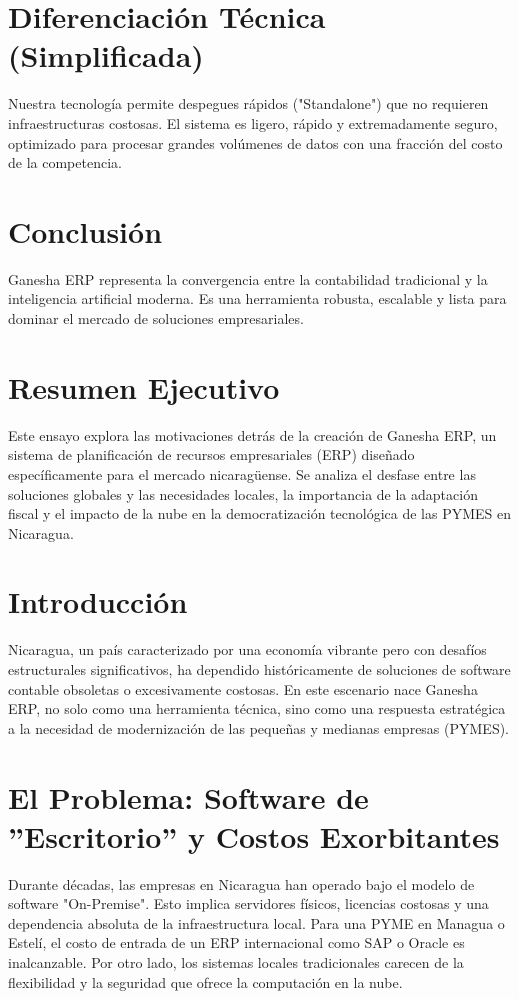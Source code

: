 \documentclass[12pt, a4paper, oneside]{book}
\begin{document}
\chapter{Diferenciación Técnica (Simplificada)}
Nuestra tecnología permite despegues rápidos ("Standalone") que no requieren infraestructuras costosas. El sistema es ligero, rápido y extremadamente seguro, optimizado para procesar grandes volúmenes de datos con una fracción del costo de la competencia.

\chapter{Conclusión}
Ganesha ERP representa la convergencia entre la contabilidad tradicional y la inteligencia artificial moderna. Es una herramienta robusta, escalable y lista para dominar el mercado de soluciones empresariales.



\chapter*{Resumen Ejecutivo}
    Este ensayo explora las motivaciones detrás de la creación de Ganesha ERP, un sistema de planificación de recursos empresariales (ERP) diseñado específicamente para el mercado nicaragüense. Se analiza el desfase entre las soluciones globales y las necesidades locales, la importancia de la adaptación fiscal y el impacto de la nube en la democratización tecnológica de las PYMES en Nicaragua.


\chapter{Introducción}
Nicaragua, un país caracterizado por una economía vibrante pero con desafíos estructurales significativos, ha dependido históricamente de soluciones de software contable obsoletas o excesivamente costosas. En este escenario nace Ganesha ERP, no solo como una herramienta técnica, sino como una respuesta estratégica a la necesidad de modernización de las pequeñas y medianas empresas (PYMES).

\chapter{El Problema: Software de ''Escritorio'' y Costos Exorbitantes}
Durante décadas, las empresas en Nicaragua han operado bajo el modelo de software "On-Premise". Esto implica servidores físicos, licencias costosas y una dependencia absoluta de la infraestructura local. Para una PYME en Managua o Estelí, el costo de entrada de un ERP internacional como SAP o Oracle es inalcanzable. Por otro lado, los sistemas locales tradicionales carecen de la flexibilidad y la seguridad que ofrece la computación en la nube.
\end{document}
